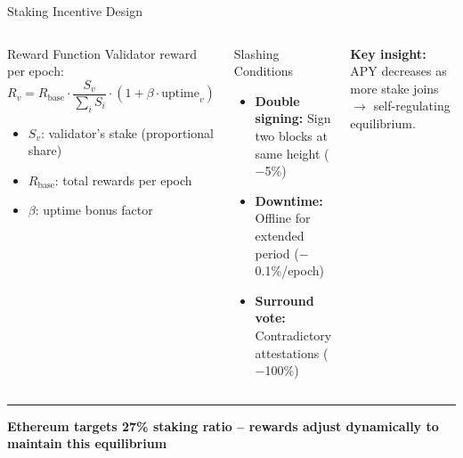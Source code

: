 \documentclass[8pt,aspectratio=169]{beamer}
\newcommand{\bottomnote}[1]{\vfill\vspace{-2mm}\textcolor{mllavender2}{\rule{\textwidth}{0.4pt}}\vspace{1mm}\footnotesize\textbf{#1}}
\begin{document}
\begin{frame}{Staking Incentive Design}
\begin{columns}[T]
\begin{block}{Reward Function}
\footnotesize
Validator reward per epoch:
\[
R_v = R_{\text{base}} \cdot \frac{S_v}{\sum_{i} S_i} \cdot (1 + \beta \cdot \text{uptime}_v)
\]
\begin{itemize}
  \item $S_v$: validator's stake (proportional share)
  \item $R_{\text{base}}$: total rewards per epoch
  \item $\beta$: uptime bonus factor
\end{itemize}
\end{block}
\vspace{1mm}
\begin{block}{Slashing Conditions}
\footnotesize
\begin{itemize}
  \item \textbf{Double signing:} Sign two blocks at same height ($-$5\%)
  \item \textbf{Downtime:} Offline for extended period ($-$0.1\%/epoch)
  \item \textbf{Surround vote:} Contradictory attestations ($-$100\%)
\end{itemize}
\end{block}

\vspace{1mm}
\footnotesize
\textbf{Key insight:} APY decreases as more stake joins $\rightarrow$ self-regulating equilibrium.
\end{columns}
\bottomnote{Ethereum targets 27\% staking ratio -- rewards adjust dynamically to maintain this equilibrium}
\end{frame}
\end{document}
